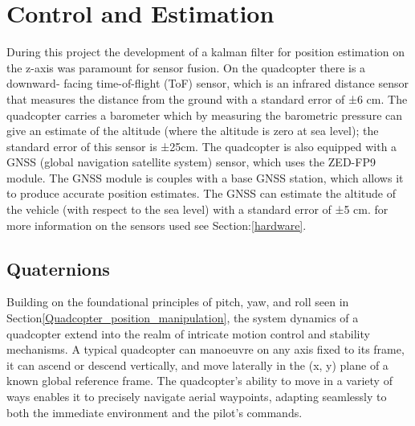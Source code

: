 \documentclass{report}
\begin{document}
\section{Control and Estimation}\label{control_and_estimation} During this
project the development of a kalman filter for position estimation on the z-axis
was paramount for sensor fusion. On the quadcopter there is a downward- facing
time-of-flight (ToF) sensor, which is an infrared distance sensor that measures
the distance from the ground with a standard error of ±6 cm. The quadcopter
carries a barometer which by measuring the barometric pressure can give an
estimate of the altitude (where the altitude is zero at sea level); the standard
error of this sensor is ±25cm. The quadcopter is also equipped with a GNSS
(global navigation satellite system) sensor, which uses the ZED-FP9 module. The
GNSS module is couples with a base GNSS station, which allows it to produce
accurate position estimates. The GNSS can estimate the altitude of the vehicle
(with respect to the sea level) with a standard error of ±5 cm. for more
information on the sensors used see Section:\ref{hardware}.
\subsection{Quaternions}
Building on the foundational principles of pitch, yaw, and roll seen in
Section\ref{Quadcopter_position_manipulation}, the system dynamics of a
quadcopter extend into the realm of intricate motion control and stability
mechanisms. A typical quadcopter can manoeuvre on any axis fixed to its frame,
it can ascend or descend vertically, and move laterally in the (x, y) plane of a
known global reference frame. The quadcopter's ability to move in a variety of
ways enables it to precisely navigate aerial waypoints, adapting seamlessly to
both the immediate environment and the pilot's commands. 
\end{document}
